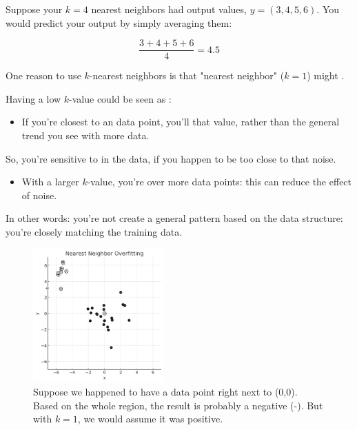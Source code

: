         \miniex Suppose your $k=4$ nearest neighbors had output values, $y = (3,4,5,6)$. You would predict your output by simply averaging them:
    
        \begin{equation}
            \frac{3+4+5+6}{4} = 4.5
        \end{equation}

        One reason to use $k$-nearest neighbors is that "nearest neighbor" ($k=1$) might .\\

        \begin{concept}
            Having a low $k$-value could be seen as :

            \begin{itemize}
                \item If you're closest to an  data point, you'll  that value, rather than the general trend you see with more data.
            \end{itemize}

            So, you're sensitive to  in the data, if you happen to be too close to that noise.

            \begin{itemize}
                \item With a larger $k$-value, you're  over more data points: this can reduce the effect of noise.
            \end{itemize}
        \end{concept}

        In other words: you're not create a general pattern based on the data structure: you're closely matching the training data.

        \begin{figure}[H]
            \centering
            \includegraphics[width=50mm,scale=0.5]{images/nonparametric_images/nearest_neighbor_overfitting.png}
    
            \caption*{Suppose we happened to have a data point right next to (0,0). Based on the whole region, the result is probably a negative (-). But with $k=1$, we would assume it was positive.}
        \end{figure}

